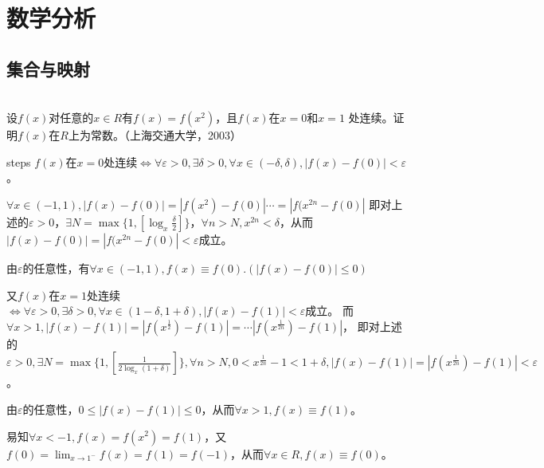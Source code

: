 \chapter{数学分析}



\section{集合与映射}

\begin{example}\label{20151012-190708}
\hfill \\
设$f(x)$对任意的$x\in R$有$f(x)=f(x^2)$，且$f(x)$在$x=0$和$x=1$ 处连续。证明$f(x)$在$R$上为常数。（上海交通大学，2003）


steps
  $f(x)$在$x=0$处连续$\Leftrightarrow\forall\varepsilon>0,\exists\delta>0,\forall x\in(-\delta,\delta),|f(x)-f(0)|<\varepsilon$。
  
  $\forall x\in(-1,1),|f(x)-f(0)|=|f(x^2)-f(0)|\cdots=|f(x^{2n}-f(0)|$
  即对上述的$\varepsilon>0$，$\exists N=\max\{1,[\log_x\frac{\delta}2]\}$，$\forall n>N,x^{2n}<\delta$，从而$|f(x)-f(0)|=|f(x^{2n}-f(0)|<\varepsilon$成立。
  
  由$\varepsilon$的任意性，有$\forall x\in(-1,1),f(x)\equiv f(0).(|f(x)-f(0)|\leq 0)$
  
  又$f(x)$在$x=1$处连续$\Leftrightarrow\forall\varepsilon>0,\exists\delta>0,\forall x\in(1-\delta,1+\delta),|f(x)-f(1)|<\varepsilon$成立。
  而$\forall x>1,|f(x)-f(1)|=|f(x^{\frac12})-f(1)|=\cdots|f(x^{\frac1{2n}})-f(1)|$，
  即对上述的$\varepsilon>0,\exists N=\max\{1,[\frac1{2\log_x(1+\delta)}]\},\forall n>N,0<x^{\frac 1{2n}}-1<1+\delta,|f(x)-f(1)|=|f(x^{\frac1{2n}})-f(1)|<\varepsilon$。
  
  由$\varepsilon$的任意性，$0\leq|f(x)-f(1)|\leq 0$，从而$\forall x>1,f(x)\equiv f(1)$。
  
  易知$\forall x<-1,f(x)=f(x^2)=f(1)$，又$f(0)=\lim_{x\rightarrow1^-}f(x)=f(1)=f(-1)$，从而$\forall x\in R,f(x)\equiv f(0)$。


\end{example}
\hfill\\

